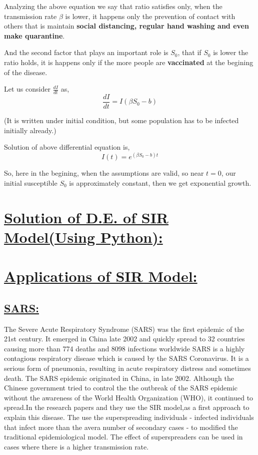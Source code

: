 \documentclass[12pt,a4paper]{article}
\begin{document}
    Analyzing the above equation we say that ratio satisfies only, when the transmission rate $\beta$ is lower, it happens only the prevention of contact with others that is maintain {\bf social distancing, regular hand washing and even make quarantine}.
    \vspace*{0.2cm}

    And the second factor that plays an important role is $S_0$, that if $S_0$ is lower the ratio holds, it is happens only if the more people are {\bf vaccinated} at the begining of the disease.

    Let us consider $\frac{dI}{dt}$ as,
    \vspace*{0.2cm}
    \[\frac{dI}{dt} = I\left(\beta S_{0} - b\right)\]
    \begin{center}
        (It is written under initial condition, but some population has to be infected initially already.)
        

        Solution of above differential equation is,
        \[I(t) = e^{(\beta S_{0} - b)t}\]

        So, here in the begining, when the assumptions are valid, so near $t = 0$, our initial susceptible $S_{0}$ is approximately constant, then we get exponential growth. 
    \end{center}
    
    
    \section*{\underline{\Large{{\bf Solution of D.E. of SIR Model(Using Python):}}}}

    

    \section*{\underline{\Large{{\bf Applications of SIR Model:}}}}

    \subsection*{\underline{{\bf SARS:}}} 
    The Severe Acute Respiratory Syndrome (SARS) was the first epidemic of the 21st century. It emerged in China late 2002 and quickly spread to 32 countries causing more than 774 deaths and 8098 infections worldwide SARS is a highly contagious respiratory disease which is caused by the SARS Coronavirus. It is a serious form of pneumonia, resulting in acute respiratory distress and sometimes death. The SARS epidemic originated in China, in late 2002. Although the Chinese government tried to control the the outbreak of the SARS epidemic without the awareness of the World Health Organization (WHO), it continued to spread.In the research papers and they use the SIR model,as a first approach to explain this disease. The use the superspreading individuals - infected individuals that infect more than the avera number of secondary cases - to modified the traditional epidemiological model. The effect of superspreaders can be used in cases where there is a higher
    transmission rate.
\end{document}
